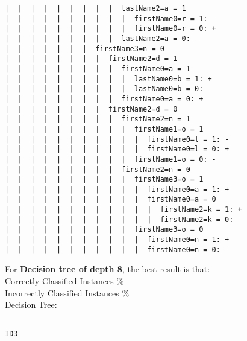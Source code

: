 \begin{enumerate}
\begin{enumerate}
\begin{lstlisting}
|  |  |  |  |  |  |  |  |  lastName2=a = 1
|  |  |  |  |  |  |  |  |  |  firstName0=r = 1: -
|  |  |  |  |  |  |  |  |  |  firstName0=r = 0: +
|  |  |  |  |  |  |  |  |  lastName2=a = 0: -
|  |  |  |  |  |  |  firstName3=n = 0
|  |  |  |  |  |  |  |  firstName2=d = 1
|  |  |  |  |  |  |  |  |  firstName0=a = 1
|  |  |  |  |  |  |  |  |  |  lastName0=b = 1: +
|  |  |  |  |  |  |  |  |  |  lastName0=b = 0: -
|  |  |  |  |  |  |  |  |  firstName0=a = 0: +
|  |  |  |  |  |  |  |  firstName2=d = 0
|  |  |  |  |  |  |  |  |  firstName2=n = 1
|  |  |  |  |  |  |  |  |  |  firstName1=o = 1
|  |  |  |  |  |  |  |  |  |  |  firstName0=l = 1: -
|  |  |  |  |  |  |  |  |  |  |  firstName0=l = 0: +
|  |  |  |  |  |  |  |  |  |  firstName1=o = 0: -
|  |  |  |  |  |  |  |  |  firstName2=n = 0
|  |  |  |  |  |  |  |  |  |  firstName3=o = 1
|  |  |  |  |  |  |  |  |  |  |  firstName0=a = 1: +
|  |  |  |  |  |  |  |  |  |  |  firstName0=a = 0
|  |  |  |  |  |  |  |  |  |  |  |  firstName2=k = 1: +
|  |  |  |  |  |  |  |  |  |  |  |  firstName2=k = 0: -
|  |  |  |  |  |  |  |  |  |  firstName3=o = 0
|  |  |  |  |  |  |  |  |  |  |  firstName0=n = 1: +
|  |  |  |  |  |  |  |  |  |  |  firstName0=n = 0: - 

\end{lstlisting}


For {\bf Decision tree of depth 8}, the best result is that:\\
Correctly Classified Instances             \% \\
Incorrectly Classified Instances            \% \\

Decision Tree:

\begin{lstlisting}

ID3


\end{lstlisting}
\end{enumerate}
\end{enumerate}
